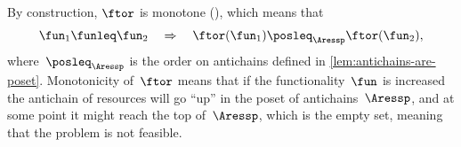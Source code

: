 By construction, $\ftor$ is monotone (), which
means that
\[
    \fun_{1}\funleq\fun_{2}\quad\Rightarrow\quad\ftor(\fun_{1})\posleq_{\Aressp}\ftor(\fun_{2}),
\]
where~$\posleq_{\Aressp}$ is the order on antichains defined in
\cref{lem:antichains-are-poset}. Monotonicity of~$\ftor$ means that
if the functionality~$\fun$ is increased the antichain of resources
will go ``up'' in the poset of antichains~$\Aressp$, and at some
point it might reach the top of~$\Aressp$, which is the empty set,
meaning that the problem is not feasible.




